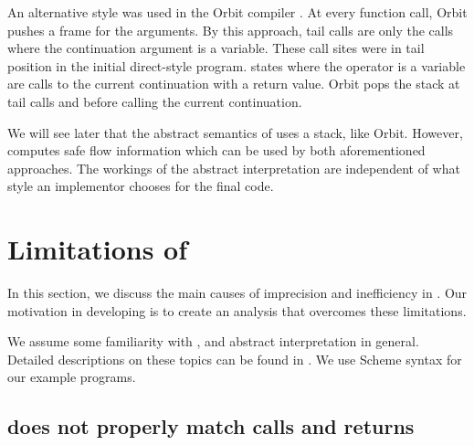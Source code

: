 \documentclass{LMCS}
\theoremstyle{definition} \newtheorem{property}[thm]{Property}
\begin{document}
An alternative style was used in the Orbit compiler \cite{diss/yale/88/kranz}.
At every function call, Orbit pushes a frame for the arguments.
By this approach, tail calls are only the calls where the continuation 
argument is a variable.
These \cps{} call sites were in tail position in the initial direct-style 
program.
\dceval{} states where the operator is a variable are calls to the current 
continuation with a return value.
Orbit pops the stack at tail calls and before calling the current continuation.

We will see later that the abstract semantics of \cfat{} uses a stack, 
like Orbit.
However, \cfat{} computes safe flow information which can be used by both 
aforementioned approaches.
The workings of the abstract interpretation are independent of what style
an implementor chooses for the final code.


\section{Limitations of \kcfa\label{sec:kcfa}}

\noindent In this section, we discuss the main causes of imprecision and inefficiency 
in \kcfa.
Our motivation in developing \cfat{} is to create an analysis that overcomes 
these limitations.

We assume some familiarity with \kcfa, and abstract interpretation in general.
Detailed descriptions on these topics can be found in
\cite{diss/cmu/91/olin, diss/07/might/dcfa}.
We use Scheme syntax for our example programs.

\subsection{{\kcfa} does not properly match calls and 
returns\label{sec:call-ret-mismatch}}
\end{document}

